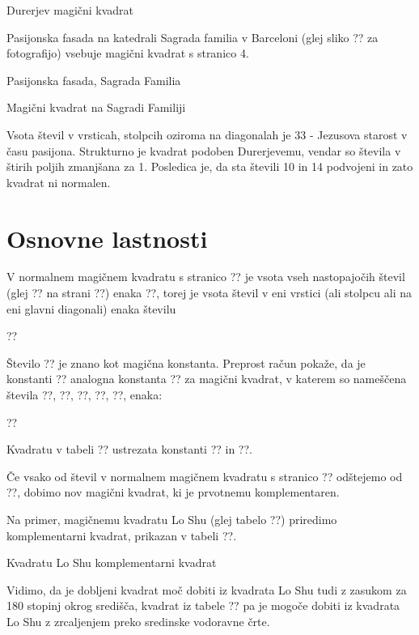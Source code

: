 \documentclass[a4paper,12pt]{article}
\begin{document}
Durerjev magični kvadrat

Pasijonska fasada na katedrali Sagrada familia v Barceloni (glej sliko
?? za fotografijo) vsebuje magični kvadrat s stranico 4.

Pasijonska fasada, Sagrada Familia

Magični kvadrat na Sagradi Familiji

Vsota števil v vrsticah, stolpcih oziroma na diagonalah je 33 - Jezusova starost
v času pasijona. Strukturno je kvadrat podoben Durerjevemu, vendar so števila
v štirih poljih zmanjšana za 1. Posledica je, da sta števili 10 in 14 podvojeni
in zato kvadrat ni normalen.

\section{Osnovne lastnosti}


V normalnem magičnem kvadratu s stranico ?? je vsota vseh nastopajočih
števil (glej ?? na strani ??) enaka
??, torej je vsota
števil v eni vrstici (ali stolpcu ali na eni glavni diagonali) enaka številu

??

Število ?? je znano kot magična konstanta. Preprost račun
pokaže, da je konstanti ?? analogna konstanta ?? za
magični kvadrat, v katerem so nameščena števila ??, ??, ??,
??, ??, enaka:

??

Kvadratu v tabeli ?? ustrezata konstanti ?? in ??.

Če vsako od števil v normalnem magičnem kvadratu s stranico ?? odštejemo
od ??, dobimo nov magični kvadrat, ki je prvotnemu komplementaren.

Na primer, magičnemu kvadratu Lo Shu (glej tabelo ??) priredimo
komplementarni kvadrat, prikazan v tabeli ??.

Kvadratu Lo Shu komplementarni kvadrat

Vidimo, da je dobljeni kvadrat moč dobiti iz kvadrata Lo Shu tudi z zasukom za
180 stopinj okrog središča, kvadrat iz tabele ?? pa je mogoče dobiti
iz kvadrata Lo Shu z zrcaljenjem preko sredinske vodoravne črte.
\end{document}
